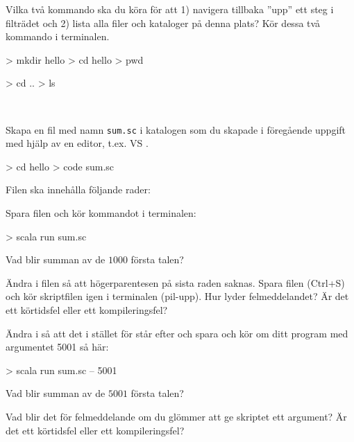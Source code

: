\Subtask Vilka två kommando ska du köra för att 1) navigera tillbaka ''upp'' ett steg i filträdet och 2) lista alla filer och kataloger på denna plats? Kör dessa två kommando i terminalen.

\SOLUTION

\TaskSolved \what

\SubtaskSolved

\begin{REPL}
> mkdir hello
> cd hello
> pwd
\end{REPL}

\SubtaskSolved

\begin{REPL}
> cd ..
> ls
\end{REPL}


\QUESTEND





\QUESTBEGIN

\Task  \what~

\Subtask Skapa en fil med namn \texttt{sum.sc} i katalogen  som du skapade i föregående uppgift med hjälp av en editor, t.ex. VS .
\begin{REPLnonum}
> cd hello
> code sum.sc
\end{REPLnonum}

\noindent Filen ska innehålla följande rader:

\noindent Spara filen och kör kommandot  i terminalen:
\begin{REPLnonum}
> scala run sum.sc
\end{REPLnonum}

\noindent Vad blir summan av de $1000$ första talen?

\Subtask Ändra i filen  så att högerparentesen på sista raden saknas. Spara filen (Ctrl+S) och kör skriptfilen igen i terminalen (pil-upp). Hur lyder felmeddelandet? Är det ett körtidsfel eller ett kompileringsfel?

\Subtask Ändra i  så att det i stället för  står  efter  och spara och kör om ditt program med argumentet 5001 så här:
\begin{REPL}
> scala run sum.sc -- 5001
\end{REPL}
\noindent Vad blir summan av de $5001$ första talen?

\Subtask Vad blir det för felmeddelande om du glömmer att ge skriptet ett argument? Är det ett körtidsfel eller ett kompileringsfel?

